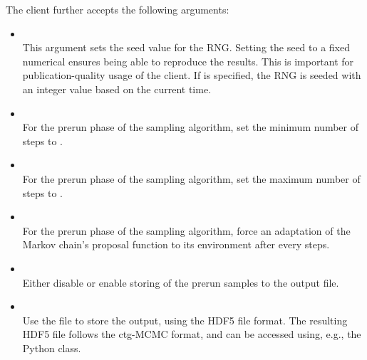 The  client further accepts the following arguments:
\begin{itemize}
    \item[] \\[\medskipamount]
        This argument sets the seed value for the \gls{RNG}. Setting the
        seed to a fixed numerical  ensures being able to reproduce the results. This
        is important for publication-quality usage of the client. If  is
        specified, the \gls{RNG} is seeded with an integer value based on the current time.

    \item[] \\[\medskipamount]
        For the prerun phase of the sampling algorithm, set the minimum number of
        steps to .

    \item[] \\[\medskipamount]
        For the prerun phase of the sampling algorithm, set the maximum number of
        steps to .

    \item[] \\[\medskipamount]
        For the prerun phase of the sampling algorithm, force an adaptation of the
        Markov chain's proposal function to its environment after every 
        steps.

    \item[] \\[\medskipamount]
        Either disable or enable storing of the prerun samples to the output file.\\

    \item[] \\[\medskipamount]
        Use the file  to store the output, using the \gls{HDF5} file format.
        The resulting \gls{HDF5} file follows the ctg-\gls{MCMC} format, and can be accessed using, e.g.,
        the  Python class.
\end{itemize}

